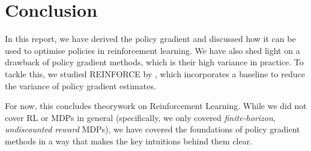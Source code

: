 \documentclass{article} %
\newtheorem{theorem}{Theorem}[section]
\begin{document}
\section{Conclusion}
In this report, we have derived the policy gradient and discussed how it can be used to optimise policies in reinforcement learning.
We have also shed light on a drawback of policy gradient methods, which is their high variance in practice.
To tackle this, we studied REINFORCE by \cite{Williams-1992}, which incorporates a baseline to reduce the variance of policy gradient estimates.

For now, this concludes theorywork on Reinforcement Learning. 
While we did not cover RL or MDPs in general (specifically, we only covered \textit{finite-horizon}, \textit{undiscounted reward} MDPs), 
we have covered the foundations of policy gradient methods in a way that makes the key intuitions behind them clear.



\end{document}
